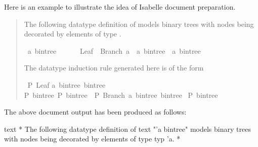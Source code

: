 \begin{isabellebody}
\begin{isamarkuptext}
  Here is an example to illustrate the idea of Isabelle document
  preparation.%
\end{isamarkuptext}%
\isamarkuptrue%
%
\begin{quotation}
%
\begin{isamarkuptext}%
The following datatype definition of  models
  binary trees with nodes being decorated by elements of type .%
\end{isamarkuptext}%
\isamarkuptrue%
\isamarkupfalse%
\ {}a\ bintree\ {}\isanewline
\ \ \ \ \ Leaf\ {}\ Branch\ {}a\ \ {}{}a\ bintree{}\ \ {}{}a\ bintree{}%
\begin{isamarkuptext}%
\noindent The datatype induction rule generated here is of the form
  \begin{isabelle}%
\ {}P\ Leaf{}\isanewline
{}a\ bintree{}\ bintree{}{}\isanewline
{}P\ bintree{}{}\ P\ bintree{}{}\ {}\ P\ {}Branch\ a\ bintree{}\ bintree{}{}{}\isanewline
{}\ P\ bintree%
\end{isabelle}%
\end{isamarkuptext}%
\isamarkuptrue%
%
\end{quotation}
%
\begin{isamarkuptext}%
\noindent The above document output has been produced as follows:

  \begin{ttbox}
  text {\ttlbrace}*
    The following datatype definition of {\at}{\ttlbrace}text "'a bintree"{\ttrbrace}
    models binary trees with nodes being decorated by elements
    of type {\at}{\ttlbrace}typ 'a{\ttrbrace}.
  *{\ttrbrace}


\end{ttbox}
\end{isamarkuptext}
\end{isabellebody}
